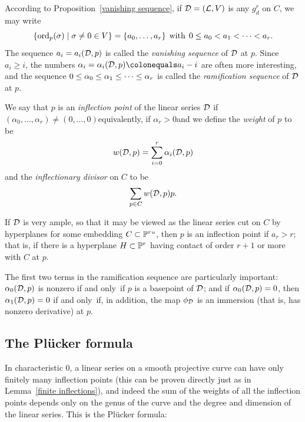 According to  Proposition~\ref{vanishing sequence}, if ${\mathcal D} = ({\mathcal L}, V)$
is any $g^r_d$ on $C$, we may write
$$
\{ \ord_p(\sigma) \mid \sigma \neq 0 \in V \} = \{a_0,\dots,a_r\} \;
\text{ with } \; 0\leq a_0 < a_1 < \dots < a_r.
$$
The sequence $a_i = a_i({\mathcal D},p)$ is called the
%
\emph{vanishing sequence} of ${\mathcal D}$ at $p$.  Since $a_i \geq i$,
the numbers
$\alpha_i = \alpha_i(\cD,p) \colonequals  a_i - i$ are often more
interesting,
and the sequence $0 \leq \alpha_0 \leq \alpha_1 \leq \dots \leq
\index{ramification sequence|defi}%
\alpha_r$ is called the \emph{ramification sequence} of ${\mathcal D}$ at $p$.

We say that $p$ is an \emph{inflection point} of the linear series ${\mathcal D}$
if $(\alpha_0,\dots,\alpha_r) \neq (0,\dots,0)$\emdash equivalently,
if $\alpha_r > 0$\emdash and we define the \emph{weight} of $p$ to be
%
$$
w({\mathcal D}, p) = \sum_{i=0}^r \alpha_i({\mathcal D}, p)
$$
and the
\emph{inflectionary divisor}
%
%
 on $C$ to be
$$
\sum_{p\in C}w({\mathcal D}, p)p.
$$

If ${\mathcal D}$ is very ample, so that it may be viewed as the linear series cut
on $C$ by hyperplanes for some embedding $C \subset {\mathbb P}^r` `$, then $p$
is an inflection point if $a_r > r$; that is, if there is a hyperplane
$H \subset {\mathbb P}^r$ having contact of order $r+1$ or more with $C$ at $p$.

The first two terms in the ramification sequence are particularly
important: $\alpha_0({\mathcal D}, p)$ is nonzero if and only~if $p$ is a basepoint
of ${\mathcal D}$; and if $\alpha_0({\mathcal D}, p)=0$, then $\alpha_1({\mathcal D}, p) = 0$ if
and only~if, in addition, the map $\phi_{\mathcal D}$ is an
immersion
%
(that is,
has nonzero derivative) at $p$.

\subsection*{The Pl\"ucker formula}

In characteristic 0, a linear series on a smooth projective curve can
%
have only finitely many inflection points (this can be proven
directly just as in Lemma~\ref{finite inflections}), and indeed the
sum of the weights of all the inflection points depends only on the
genus of the curve and the degree and dimension
of the linear
series. This is the Pl\"ucker formula:

